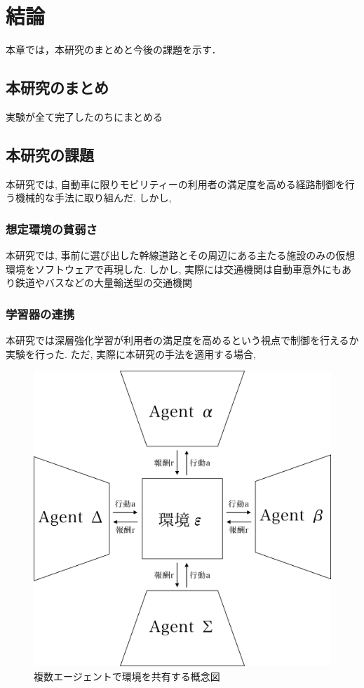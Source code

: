 \chapter{結論}
\label{conclusion}

本章では，本研究のまとめと今後の課題を示す．

\section{本研究のまとめ}

実験が全て完了したのちにまとめる

\section{本研究の課題}

本研究では, 自動車に限りモビリティーの利用者の満足度を高める経路制御を行う機械的な手法に取り組んだ.
しかし,

\subsection{想定環境の貧弱さ}

本研究では, 事前に選び出した幹線道路とその周辺にある主たる施設のみの仮想環境をソフトウェアで再現した. 
しかし, 実際には交通機関は自動車意外にもあり鉄道やバスなどの大量輸送型の交通機関

\subsection{学習器の連携}

本研究では深層強化学習が利用者の満足度を高めるという視点で制御を行えるか実験を行った.
ただ, 実際に本研究の手法を適用する場合, 



\begin{figure}[H]
    \centering
    \includegraphics[clip,width = 12.0cm]{assets/multiagent_shared_env.eps}
    \caption{複数エージェントで環境を共有する概念図}  \label{sample}
\end{figure}

